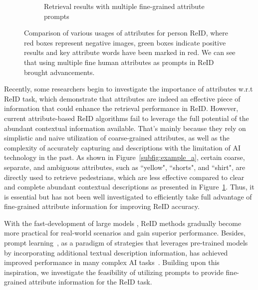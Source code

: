 \documentclass[letterpaper]{article} %
\begin{document}
\begin{figure}[t!]
\begin{subfigure}[t]{1\columnwidth}
		\vspace{-0.1cm}
        \caption{Retrieval results with multiple fine-grained attribute prompts}
    \label{subfig:example_c}
  \end{subfigure}
   \vspace{-0.3cm}
   \caption{Comparison of various usages of attributes for person ReID, where red boxes represent negative images, green boxes indicate positive results and key attribute words have been marked in red. We can see that using multiple fine human attributes as prompts in ReID brought advancements.}
   \vspace{-0.4cm}
	\label{fig:example}
\end{figure}

Recently, some researchers \cite{jia2021spatial,niu2022cross,specker2023upar, zheng2022progressive} begin to investigate the importance of attributes w.r.t ReID task, which demonstrate that attributes are indeed an effective piece of information that could enhance the retrieval performance in ReID. 
However, current attribute-based ReID algorithms fail to leverage the full potential of the abundant contextual information available. That's mainly because they rely on simplistic and naive utilization of coarse-grained attributes, as well as the complexity of accurately capturing and descriptions with the limitation of AI technology in the past. As shown in Figure~\ref{subfig:example_a}, certain coarse, separate, and ambiguous attributes, such as ``yellow", ``shorts", and ``shirt", are directly used to retrieve pedestrians, which are less effective compared to clear and complete abundant contextual descriptions as presented in Figure~\ref{subfig:example_c}. Thus, it is essential but has not been well investigated to efficiently take full advantage of fine-grained attribute information for improving ReID accuracy.

With the fast-development of large models \cite{fu2022large,jin2022meta,li2023blip2}, ReID methods gradually become more practical for real-world scenarios and gain superior performance. Besides, prompt learning~\cite{wu2022fast,zhou2022learning}, as a paradigm of strategies that leverages pre-trained models by incorporating additional textual description information, has achieved improved performance in many complex AI tasks~\cite{zeng2022point,luddecke2022image,liu2022dpt}. Building upon this inspiration, we investigate the feasibility of utilizing prompts to provide fine-grained attribute information for the ReID task.
\end{document}
